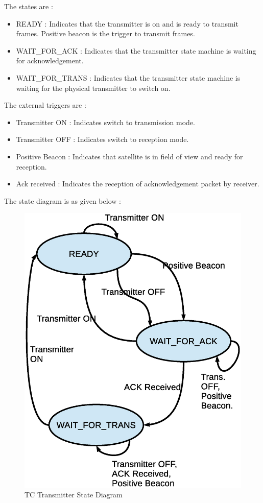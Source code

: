 \documentclass[BTech]{iitmdiss}
\begin{document}
The states are :
\begin{itemize}
\item READY : Indicates that the transmitter is on and is ready to transmit frames. Positive beacon is the trigger to transmit frames.
\item WAIT\_FOR\_ACK : Indicates that the transmitter state machine is waiting for acknowledgement. 
\item WAIT\_FOR\_TRANS :  Indicates that the transmitter state machine is waiting for the physical transmitter to switch on. 
\end{itemize}

The external triggers are :
\begin{itemize}
\item Transmitter ON : Indicates switch to transmission mode.
\item Transmitter OFF : Indicates switch to reception mode.
\item Positive Beacon : Indicates that satellite is in field of view and ready for reception.
\item Ack received : Indicates the reception of acknowledgement packet by receiver.

\end{itemize}
The state diagram is as given below :
\begin{figure}[H]
\includegraphics[scale = 0.5]{state.eps}
\caption{TC Transmitter State Diagram }
\label{fig:state}
\end{figure}
\end{document}
